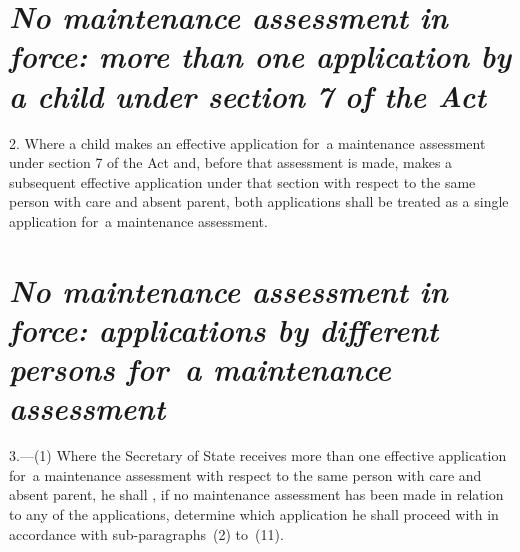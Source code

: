 \documentclass[a4paper,12pt]{article}
\begin{document}
%
%


\section*{\itshape No maintenance assessment in force: more than one application by a child under section 7 of the Act}

2.  Where a child makes an effective application for~a maintenance assessment under section 7 of the Act and, before that assessment is made, makes a subsequent effective application under that section with respect to the same person with care and absent parent, both applications shall be treated as a single application for~a maintenance assessment.

\section*{\itshape No maintenance assessment in force: applications by different persons for~a maintenance assessment}

3.—(1) Where the Secretary of State receives more than one effective application for~a maintenance assessment with respect to the same person with care and absent parent, he shall%
, if no maintenance assessment has been made in relation to any of the applications,  %
determine which application he shall proceed with in accordance with sub-paragraphs~(2) to~(11).
\end{document}
